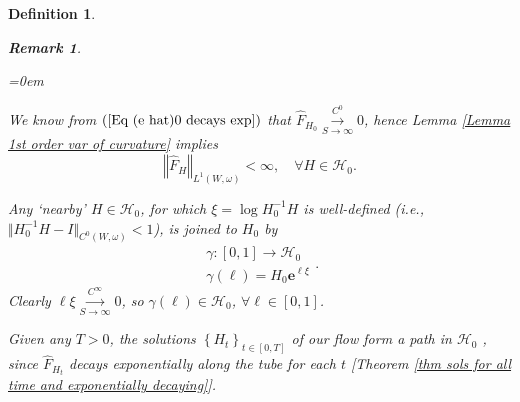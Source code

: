 \documentclass{article}
\newcommand{\tublim}{\overset{C^\infty}{\underset{S\rightarrow\infty}{\longrightarrow}}}
\newcommand{\e}[1]{\mathbf{e}^{#1}}
\newtheorem{definition}[theorem]{Definition}
\newtheorem{remark}[theorem]{Remark}
\begin{document}
\begin{definition}
\begin{remark}
\begin{list}{}{\leftmargin=0em}
        \item[(3)]
We know from $(\ref{Eq (e hat)0 decays exp})$ that $\hat{F}_{H_0} \overset{C^0}{\underset{S\rightarrow\infty}{\longrightarrow}} 0$, hence \emph{Lemma \ref{Lemma 1st order var of curvature}} implies
\begin{displaymath}
        \left\Vert \hat{F}_{H}\right\Vert _{L^{1}\left( W,\omega\right)}
        <\infty, \quad\forall H \in\mathcal{H}_0.
\end{displaymath}
        \item[(4)] 
Any `nearby' $H\in \mathcal{H}_{0}$, for which $\xi =\log H_{0}^{-1}H$ is well-defined (i.e.,  $\Vert H_{0}^{-1}H-I\Vert_{C^{0}(W,\omega)}<1$), is joined to $H_{0}$ by 
\begin{equation}        \label{eq def path in H0}
\begin{array}{c}
        \gamma :\left[ 0,1\right] \rightarrow \mathcal{H}_{0} \\ 
        \gamma \left( \ell \right) =H_{0}\e{\ell \xi }%
\end{array}.
\end{equation}%
Clearly $\ell\xi \tublim 0$, so $\gamma(\ell)\in \mathcal{H}_0$, $\forall\ell \in [0,1]$.
        \item[(5)] 
        Given any $T>0$, the solutions $\left\{ H_{t}\right\} _{t\in \left[0,T\right] }$ of our flow form a path in $\mathcal{H}_{0}$%
, since $\hat{F}_{H_{t}}$ decays exponentially along
the tube for each  $t$ [\emph{Theorem \ref{thm sols for all time and exponentially decaying}}].
\end{list}
\end{remark}
\end{definition}
\end{document}
